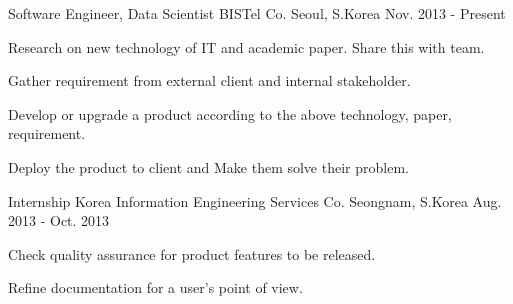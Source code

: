

\begin{cventries}

  \cventry
    {Software Engineer, Data Scientist} %
    {BISTel Co.} %
    {Seoul, S.Korea} %
    {Nov. 2013 - Present} %
    {
      \begin{cvitems} %
        \item {Research on new technology of IT and academic paper. Share this with team.}
        \item {Gather requirement from external client and internal stakeholder.}
        \item {Develop or upgrade a product according to the above technology, paper, requirement.}
        \item {Deploy the product to client and Make them solve their problem.}
      \end{cvitems}
    }

  \cventry
    {Internship} %
    {Korea Information Engineering Services Co.} %
    {Seongnam, S.Korea} %
    {Aug. 2013 - Oct. 2013} %
    {
      \begin{cvitems} %
        \item {Check quality assurance for product features to be released.}
        \item {Refine documentation for a user's point of view.}
      \end{cvitems}
    }

\end{cventries}
